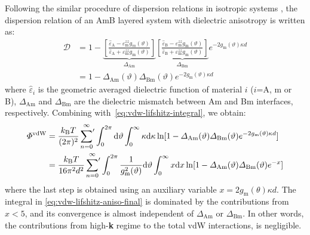 % 
Following the similar procedure of dispersion relations in isotropic
systems \cite{parsegian_van_2010_book}, the dispersion relation
 of an AmB layered system with
dielectric anisotropy is written as:
\begin{equation}
\label{eq:vdw-disper-D}
\begin{aligned}
\mathcal{D}
&=
1 - 
\underbrace{\left[
\frac{\hat{\varepsilon}_{\mathrm{A}} - \varepsilon_{\mathrm{m}}^{zz} g_{m}(\vartheta) }{\hat{\varepsilon}_{\mathrm{A}} + \varepsilon_{\mathrm{m}}^{zz} g_{\mathrm{m}}(\vartheta)}
\right]}_{\Delta_{\mathrm{Am}}}
\underbrace{\left[
\frac{\hat{\varepsilon}_{\mathrm{B}} - \varepsilon_{\mathrm{m}}^{zz} g_{\mathrm{m}}(\vartheta) }{\hat{\varepsilon}_{\mathrm{B}} + \varepsilon_{\mathrm{m}}^{zz} g_{\mathrm{m}}(\vartheta)}
\right]}_{\Delta_{\mathrm{Bm}}}
e^{-2 g_{\mathrm{m}}(\vartheta) \kappa d} \\
&= 1 - \Delta_{\mathrm{Am}}(\vartheta) \Delta_{\mathrm{Bm}}(\vartheta) e^{-2 g_{\mathrm{m}}(\vartheta) \kappa d}
\end{aligned}
\end{equation}
where \(\hat{\varepsilon}_{i}\) is the geometric averaged dielectric
function of material $i$ ($i$=A, m or B), $\Delta_{\mathrm{Am}}$ and
$\Delta_{\mathrm{Bm}}$ are the dielectric mismatch between Am and Bm
interfaces, respectively.  Combining
with~\autoref{eq:vdw-lifshitz-integral}, we obtain:
\begin{equation}
\label{eq:vdw-lifshitz-aniso-final}
\begin{aligned}
\Phi^{\mathrm{vdW}}
&= \frac{k_{\mathrm{B}} T}{(2 \pi)^{2}} \sideset{}{'}\sum_{n=0}^{\infty}
\int_{0}^{2 \pi} \mathrm{d}\vartheta
\int_{0}^{\infty} \kappa \mathrm{d}\kappa 
\ln[1 - \Delta_{\mathrm{Am}}(\vartheta) 
\Delta_{\mathrm{Bm}}(\vartheta) e^{-2 g_{\mathrm{m}}(\vartheta) \kappa d}] \\
&= \frac{k_{\mathrm{B}} T}{16 \pi^{2} d^{2}}
\sideset{}{'}\sum_{n=0}^{\infty} \int_{0}^{2 \pi} 
\frac{1}{g^{2}_{\mathrm{m}}(\vartheta)}\mathrm{d}\vartheta
\int_{0}^{\infty} x \mathrm{d}x
\ln[1 - \Delta_{\mathrm{Am}}(\vartheta) \Delta_{\mathrm{Bm}}(\vartheta) e^{-x}] \\
\end{aligned}
\end{equation}
where the last step is obtained using an auxiliary variable \(x = 2
g_{\mathrm{m}}(\mathcal{\theta}) \kappa d\).
%
%
The integral in \autoref{eq:vdw-lifshitz-aniso-final} is dominated by
the contributions from $x < 5$, and its convergence is almost
independent of $\Delta_{\mathrm{Am}}$ or $\Delta_{\mathrm{Bm}}$. In
other words, the contributions from high-\textbf{k} regime to the
total vdW interactions, is negligible.  

